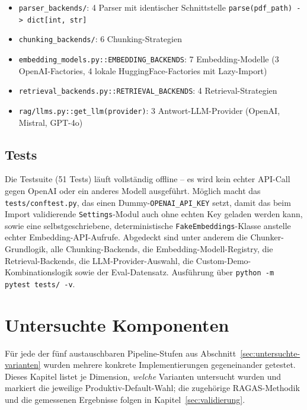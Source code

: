 \documentclass[11pt,a4paper]{article}
\begin{document}
\begin{itemize}
    \item \texttt{parser\_backends/}: 4 Parser mit identischer Schnittstelle \texttt{parse(pdf\_path) -> dict[int, str]}
    \item \texttt{chunking\_backends/}: 6 Chunking-Strategien
    \item \texttt{embedding\_models.py::EMBEDDING\_BACKENDS}: 7 Embedding-Modelle (3 OpenAI-Factories, 4 lokale HuggingFace-Factories mit Lazy-Import)
    \item \texttt{retrieval\_backends.py::RETRIEVAL\_BACKENDS}: 4 Retrieval-Strategien
    \item \texttt{rag/llms.py::get\_llm(provider)}: 3 Antwort-LLM-Provider (OpenAI, Mistral, GPT-4o)
\end{itemize}

\subsection{Tests}

Die Testsuite (51 Tests) läuft vollständig offline -- es wird kein echter
API-Call gegen OpenAI oder ein anderes Modell ausgeführt. Möglich macht das
\texttt{tests/conftest.py}, das einen Dummy-\texttt{OPENAI\_API\_KEY} setzt,
damit das beim Import validierende \texttt{Settings}-Modul auch ohne
echten Key geladen werden kann, sowie eine selbstgeschriebene, deterministische
\texttt{FakeEmbeddings}-Klasse anstelle echter Embedding-API-Aufrufe.
Abgedeckt sind unter anderem die Chunker-Grundlogik, alle
Chunking-Backends, die Embedding-Modell-Registry, die Retrieval-Backends,
die LLM-Provider-Auswahl, die Custom-Demo-Kombinationslogik sowie der
Eval-Datensatz. Ausführung über \texttt{python -m pytest tests/ -v}.

\section{Untersuchte Komponenten}
\label{sec:vergleiche}

Für jede der fünf austauschbaren Pipeline-Stufen aus
Abschnitt~\ref{sec:untersuchte-varianten} wurden mehrere konkrete
Implementierungen gegeneinander getestet. Dieses Kapitel listet je
Dimension, \emph{welche} Varianten untersucht wurden und markiert die
jeweilige Produktiv-Default-Wahl; die zugehörige RAGAS-Methodik und die
gemessenen Ergebnisse folgen in Kapitel~\ref{sec:validierung}.
\end{document}
